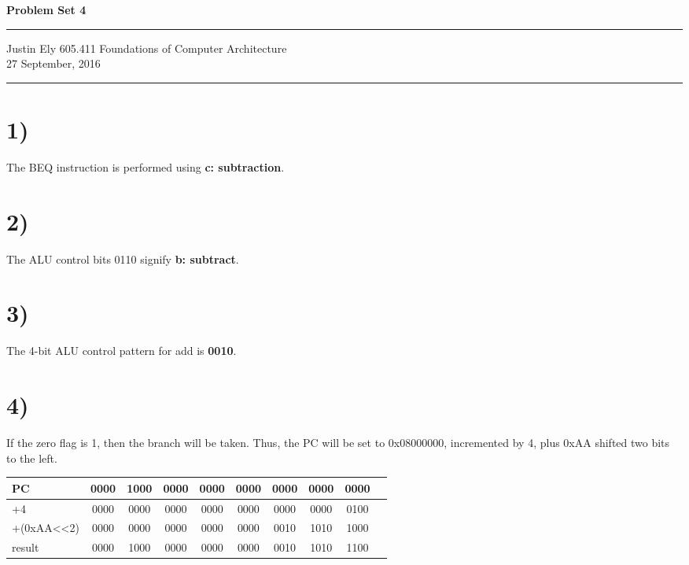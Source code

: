 \documentclass[a4paper,11pt]{article}
\begin{document}
\begin{flushright}

\vspace{1.1cm}

{\bf\Huge Problem Set 4}

\rule{0.25\linewidth}{0.5pt}

\vspace{0.5cm}
Justin Ely
\linebreak
\newline
\footnotesize{605.411 Foundations of Computer Architecture \\}
\vspace{0.5cm}
27 September, 2016
\end{flushright}

\noindent\rule{\linewidth}{1.0pt}


\section*{1)}
The BEQ instruction is performed using {\bf c: subtraction}.


\section*{2)} 
The ALU control bits 0110 signify {\bf b: subtract}.


\section*{3)}
The 4-bit ALU control pattern for add is {\bf 0010}.


\section*{4)}
If the zero flag is 1, then the branch will be taken.  Thus, the PC will be set to 0x08000000, incremented by 4, plus 0xAA shifted two bits 
to the left.  \\

\begin{tabular}{| l | c | c | c | c | c | c | c | c | c |}
  \hline	
  PC  & 0000 & 1000 & 0000 & 0000 & 0000 & 0000 & 0000 & 0000 \\  \hline
  +4  & 0000 & 0000 & 0000 & 0000 & 0000 & 0000 & 0000 & 0100 \\  \hline
  +(0xAA\textless \textless 2)  & 0000 & 0000 & 0000 & 0000 & 0000 & 0010 & 1010 & 1000 \\  \hline
  result & 0000 & 1000 & 0000 & 0000 & 0000 & 0010 & 1010 & 1100 \\  \hline
\end{tabular} \\
\end{document}
